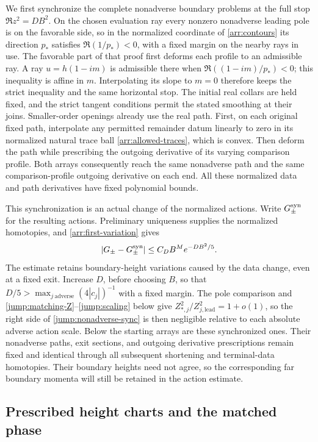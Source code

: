 We first synchronize the complete nonadverse boundary problems at the
full stop $\Re z^2=DB^2$.  On the chosen evaluation ray every nonzero
nonadverse leading pole is on the favorable side, so in the normalized
coordinate of \cref{arr:contours} its direction $p_*$ satisfies
$\Re(1/p_*)<0$, with a fixed margin on the nearby rays in use.  The
favorable part of that proof first deforms each profile to an admissible
ray.  A ray $u=h(1-im)$ is admissible there when
$\Re((1-im)/p_*)<0$; this inequality is affine in $m$.  Interpolating
its slope to $m=0$ therefore keeps the strict inequality and the same
horizontal stop.  The initial real collars are held fixed, and the
strict tangent conditions permit the stated smoothing at their joins.
Smaller-order openings already use the real path.  First, on each
original fixed path, interpolate any permitted remainder datum linearly
to zero in its normalized natural trace ball
\eqref{arr:allowed-traces}, which is convex.  Then deform the path while
prescribing the outgoing derivative of its varying comparison profile.
Both arrays consequently reach the same nonadverse path and the same
comparison-profile outgoing derivative on each end.  All these
normalized data and path derivatives have fixed polynomial bounds.

This synchronization is an actual change of the normalized actions.
Write $G_\pm^{\rm syn}$ for the resulting actions.  Preliminary
uniqueness supplies the normalized homotopies, and
\cref{arr:first-variation} gives
\begin{equation}\label{jump:nonadverse-sync}
 |G_\pm-G_\pm^{\rm syn}|
       \le C_D B^M e^{-DB^2/5}.
\end{equation}
The estimate retains boundary-height variations caused by the data
change, even at a fixed exit.  Increase $D$, before choosing $B$, so
that $D/5>\max_{j\ \mathrm{adverse}}(4|c_j|)^{-1}$ with a fixed
margin.  The pole comparison and
\eqref{jump:matching-Z}--\eqref{jump:scaling} below give
$Z_{*,j}^2/Z_{j,\mathrm{lead}}^2=1+o(1)$, so the right
side of \eqref{jump:nonadverse-sync} is then negligible relative to
each absolute adverse action scale.  Below the starting arrays are
these synchronized ones.  Their nonadverse paths, exit sections, and
outgoing derivative prescriptions remain fixed and identical through
all subsequent shortening and terminal-data homotopies.  Their boundary
heights need not agree, so the corresponding far boundary momenta will
still be retained in the action estimate.

\subsection{Prescribed height charts and the matched phase}

